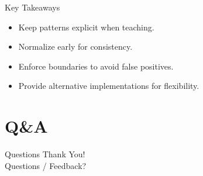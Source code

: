 \documentclass[aspectratio=169]{beamer}
\begin{document}
\begin{frame}{Key Takeaways}
  \begin{itemize}
    \item Keep patterns explicit when teaching.
    \item Normalize early for consistency.
    \item Enforce boundaries to avoid false positives.
    \item Provide alternative implementations for flexibility.
  \end{itemize}
\end{frame}

\section*{Q&A}

\begin{frame}{Questions}
  \centering \Huge Thank You!\\[1em]
  \large Questions / Feedback?
\end{frame}
\end{document}
